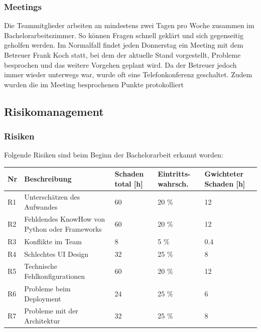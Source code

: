 \subsubsection*{Meetings}
Die Teammitglieder arbeiten an mindestens zwei Tagen pro Woche zusammen im Bachelorarbeitszimmer. So können Fragen schnell geklärt und sich gegenseitig geholfen werden. Im Normalfall findet jeden Donnerstag ein Meeting mit dem Betreuer Frank Koch statt, bei dem der aktuelle Stand vorgestellt, Probleme besprochen und das weitere Vorgehen geplant wird. Da der Betreuer jedoch immer wieder unterwegs war, wurde oft eine Telefonkonferenz geschaltet. Zudem wurden die im Meeting besprochenen Punkte protokolliert

\subsection{Risikomanagement}
\subsubsection*{Risiken}
Folgende Risiken sind beim Beginn der Bachelorarbeit erkannt worden:

\renewcommand{\arraystretch}{1.2}
\begin{table}[h]
	\centering
	\begin{tabu} to 0.9
	\toprule
	Nr & Beschreibung & Schaden total [h] & Eintritts-wahrsch. & Gwichteter Schaden [h]\\ 
	\midrule
	R1 & Unterschätzen des Aufwandes & 60 & 20 \% & 12 \\
	R2 & Fehldendes KnowHow von \newline Python oder Frameworks & 60 & 20 \% & 12 \\
	R3 & Konflikte im Team & 8 & 5 \% & 0.4 \\
	R4 & Schlechtes UI Design & 32 & 25 \% & 8 \\
	R5 & Technische \newline Fehlkonfigurationen & 60 & 20 \% & 12 \\
	R6 & Probleme beim Deployment & 24 & 25 \% & 6 \\ 
	R7 & Probleme mit der Architektur & 32 & 25 \% & 8 \\
	\bottomrule
	\end{tabu}
\end{table}

